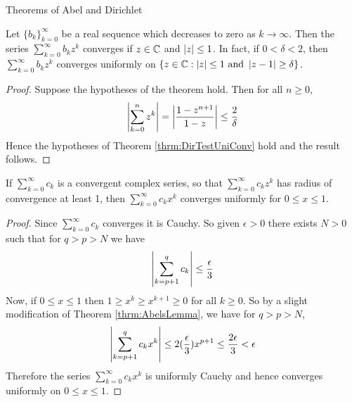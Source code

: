 \begin{section}{Theorems of Abel and Dirichlet}
\begin{cor}
	Let $\{b_k\}_{k=0}^\infty$ be a real sequence which decreases
	to zero as $k \rightarrow \infty$. Then the series 
	$\sum_{k=0}^\infty b_k z^k$ converges if ${z} \in \mathbb{C}$ and 
	$\left \vert {z} \right \vert \leq 1$. In fact, if $0 < \delta < 2$, then
	$\sum_{k=0}^\infty b_k z^k$ converges uniformly on
	$\{{z} \in \mathbb{C} : \left \vert {z} \right \vert \leq 1 \text{ and } \left \vert {z-1} \right \vert
	\geq \delta\}$.
\end{cor}

\begin{proof}
	Suppose the hypotheses of the theorem hold. Then for all $n \geq 0$,
		\begin{displaymath}
			\left \vert {\sum_{k=0}^n z^k} \right \vert = 
				\left \vert {\frac{1 - z^{n+1}}{1-z}} \right \vert \leq \frac{2}{\delta}
		\end{displaymath}
	Hence the hypotheses of Theorem \ref{thrm:DirTestUniConv} hold
	and the result follows.
\end{proof}


\begin{thrm}\label{thrm:Abel}
	If $\sum_{k=0}^\infty c_k$ is a convergent complex series,
	so that $\sum_{k=0}^\infty c_k z^k$ has radius of convergence
	at least 1, then $\sum_{k=0}^\infty c_k x^k$ converges uniformly
	for $0 \leq x \leq 1$.
\end{thrm}

\begin{proof}
	Since $\sum_{k=0}^\infty c_k$ converges it is Cauchy. So given
	$\epsilon > 0$ there exists $N > 0$ such that for $q > p > N$
	we have
		\begin{displaymath}
			\left \vert {\sum_{k=p+1}^q c_k} \right \vert \leq \frac{\epsilon}{3}
		\end{displaymath}
	Now, if $0 \leq x \leq 1$ then $1 \geq x^k \geq x^{k+1} \geq 0$
	for all $k \geq 0$. So by a slight modification of Theorem
	\ref{thrm:AbelsLemma}, we have for $q > p > N$,
		\begin{displaymath}
			\left \vert {\sum_{k=p+1}^q c_k x^k} \right \vert \leq
				2(\frac{\epsilon}{3})x^{p+1} \leq
				\frac{2\epsilon}{3} < \epsilon
		\end{displaymath}
	Therefore the series $\sum_{k=0}^\infty c_k x^k$ is uniformly
	Cauchy and hence converges uniformly on $0 \leq x \leq 1$.
\end{proof}



\end{section}
